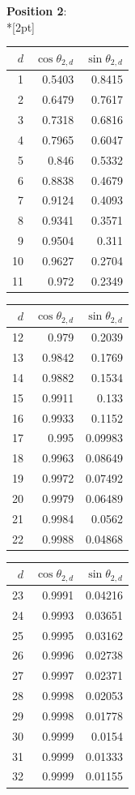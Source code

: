 \noindent \textbf{Position 2}:\\*[2pt]
{\tablefont \begin{tabular}[t]{r|rr}
$d$ & $\cos\theta_{2,d}$ & $\sin\theta_{2,d}$ \\\hline
1 & 0.5403 & 0.8415 \\
2 & 0.6479 & 0.7617 \\
3 & 0.7318 & 0.6816 \\
4 & 0.7965 & 0.6047 \\
5 & 0.846 & 0.5332 \\
6 & 0.8838 & 0.4679 \\
7 & 0.9124 & 0.4093 \\
8 & 0.9341 & 0.3571 \\
9 & 0.9504 & 0.311 \\
10 & 0.9627 & 0.2704 \\
11 & 0.972 & 0.2349
\end{tabular}\kern4pt
\begin{tabular}[t]{r|rr}
$d$ & $\cos\theta_{2,d}$ & $\sin\theta_{2,d}$ \\\hline
12 & 0.979 & 0.2039 \\
13 & 0.9842 & 0.1769 \\
14 & 0.9882 & 0.1534 \\
15 & 0.9911 & 0.133 \\
16 & 0.9933 & 0.1152 \\
17 & 0.995 & 0.09983 \\
18 & 0.9963 & 0.08649 \\
19 & 0.9972 & 0.07492 \\
20 & 0.9979 & 0.06489 \\
21 & 0.9984 & 0.0562 \\
22 & 0.9988 & 0.04868
\end{tabular}\kern4pt
\begin{tabular}[t]{r|rr}
$d$ & $\cos\theta_{2,d}$ & $\sin\theta_{2,d}$ \\\hline
23 & 0.9991 & 0.04216 \\
24 & 0.9993 & 0.03651 \\
25 & 0.9995 & 0.03162 \\
26 & 0.9996 & 0.02738 \\
27 & 0.9997 & 0.02371 \\
28 & 0.9998 & 0.02053 \\
29 & 0.9998 & 0.01778 \\
30 & 0.9999 & 0.0154 \\
31 & 0.9999 & 0.01333 \\
32 & 0.9999 & 0.01155 \\

\end{tabular}}
